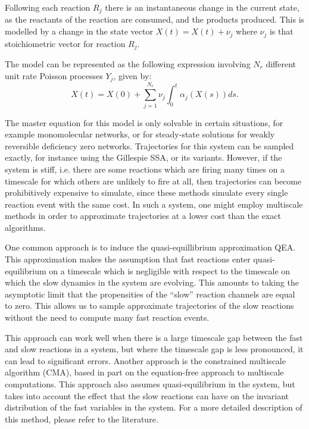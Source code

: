 \documentclass[final]{siamltex}
\begin{document}
Following each reaction $R_j$ there is an instantaneous change in the
current state, as the reactants of the reaction are consumed, and the
products produced. This is modelled by a change in the state vector
$X(t) = X(t) + \nu_j$ where $\nu_j$ is that stoichiometric vector for
reaction $R_j$.

The model can be represented as the following expression involving
$N_r$ different unit rate Poisson
processes\cite{anderson2011continuous} $Y_j$, given by:
\begin{equation}\label{eq:RTC}
X(t) = X(0) + \sum_{j=1}^{N_r} \nu_j \int_0^t \alpha_j(X(s)) ds.
\end{equation}

The master equation for this model is only solvable in certain
situations, for example monomolecular networks\cite{jahnke2007solving}, or for
steady-state solutions for weakly reversible deficiency
zero networks\cite{anderson2010product,anderson2016product}. Trajectories for this system can be
sampled exactly, for instance using the Gillespie SSA\cite{gillespie1977exact}, or
its variants\cite{gillespie2007stochastic,cao2004efficient,anderson2007modified}. However, if the system is stiff, i.e. there
are some reactions which are firing many times on a timescale for
which others are unlikely to fire at all, then trajectories can become
prohibitively expensive to simulate, since these methods simulate
every single reaction event with the same cost. In such a system, one
might employ multiscale methods in order to approximate trajectories
at a lower cost than the exact algorithms.

One common approach is to induce the quasi-equillibrium approximation
QEA. This approximation makes the assumption that fast reactions
enter quasi-equilibrium on a timescale which is negligible with
respect to the timescale on which the slow dynamics in the system are
evolving. This amounts to taking the asymptotic limit that the
propensities of the ``slow'' reaction channels are equal to zero. This
allows us to sample approximate trajectories of the slow reactions
without the need to compute many fast reaction events.

This approach can work well when there is a large timescale gap
between the fast and slow reactions in a system, but where the
timescale gap is less pronounced, it can lead to significant
errors\cite{cotter2016error}. Another approach is the
constrained multiscale algorithm (CMA)\cite{cotter2011constrained,cotter2016constrained}, based in part on the
equation-free approach to multiscale computations\cite{kevrekidis2003equation,erban2006gene}. This approach also assumes quasi-equilibrium in the
system, but takes into account the effect that the slow reactions can
have on the invariant distribution of the fast variables in the
system. For a more detailed description of this method, please refer
to the literature\cite{cotter2016constrained}.
\end{document}

